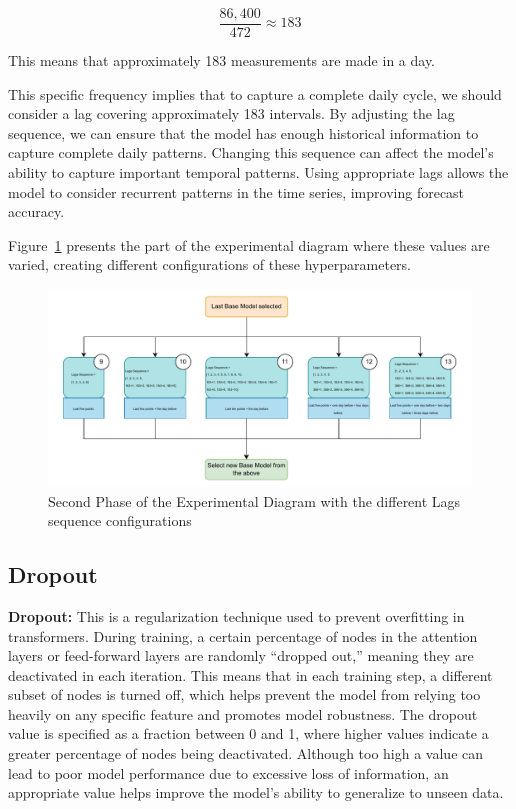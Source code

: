 \[
\frac{86,400}{472} \approx 183
\]

This means that approximately 183 measurements are made in a day.

This specific frequency implies that to capture a complete daily cycle, we should consider a lag covering approximately 183 intervals. By adjusting the lag sequence, we can ensure that the model has enough historical information to capture complete daily patterns. Changing this sequence can affect the model's ability to capture important temporal patterns. Using appropriate lags allows the model to consider recurrent patterns in the time series, improving forecast accuracy.

Figure~\ref{D2} presents the part of the experimental diagram where these values are varied, creating different configurations of these hyperparameters.

\begin{figure}[htbp]
    \centering
    \includegraphics[width=15 cm]{5_ChapterDesign/figuras/Diagrams/D2.pdf}
    \caption{Second Phase of the Experimental Diagram with the different Lags sequence configurations}
    \label{D2}
\end{figure}

\subsection{Dropout}
\textbf{Dropout:}  This is a regularization technique used to prevent overfitting in transformers. During training, a certain percentage of nodes in the attention layers or feed-forward layers are randomly “dropped out,” meaning they are deactivated in each iteration. This means that in each training step, a different subset of nodes is turned off, which helps prevent the model from relying too heavily on any specific feature and promotes model robustness. The dropout value is specified as a fraction between 0 and 1, where higher values indicate a greater percentage of nodes being deactivated. Although too high a value can lead to poor model performance due to excessive loss of information, an appropriate value helps improve the model’s ability to generalize to unseen data.

